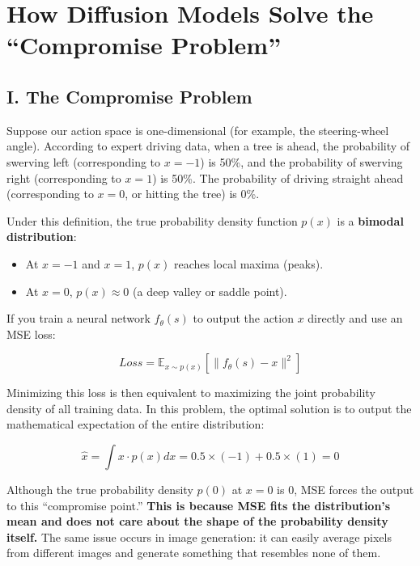 \setcounter{section}{4}

\hypertarget{how-diffusion-models-solve-the-compromise-problem}{%
\section{How Diffusion Models Solve the ``Compromise Problem''}\label{how-diffusion-models-solve-the-compromise-problem}}

\hypertarget{i.-the-compromise-problem}{%
\subsection{I. The Compromise Problem}\label{i.-the-compromise-problem}}

Suppose our action space is one-dimensional (for example, the steering-wheel angle). According to expert driving data, when a tree is ahead, the probability of swerving left (corresponding to \(x=-1\)) is 50\%, and the probability of swerving right (corresponding to \(x=1\)) is 50\%. The probability of driving straight ahead (corresponding to \(x=0\), or hitting the tree) is 0\%.

Under this definition, the true probability density function \(p(x)\) is a \textbf{bimodal distribution}:

\begin{itemize}
\tightlist
\item
  At \(x=-1\) and \(x=1\), \(p(x)\) reaches local maxima (peaks).
\item
  At \(x=0\), \(p(x)\approx 0\) (a deep valley or saddle point).
\end{itemize}

If you train a neural network \(f_\theta(s)\) to output the action \(x\) directly and use an MSE loss:

\[
Loss=\mathbb{E}_{x\sim p(x)}\left[\lVert f_\theta(s)-x\rVert^2\right]
\]

Minimizing this loss is then equivalent to maximizing the joint probability density of all training data. In this problem, the optimal solution is to output the mathematical expectation of the entire distribution:

\[
\hat{x}=\int x\cdot p(x)dx=0.5\times(-1)+0.5\times(1)=0
\]

Although the true probability density \(p(0)\) at \(x=0\) is 0, MSE forces the output to this ``compromise point.'' \textbf{This is because MSE fits the distribution's mean and does not care about the shape of the probability density itself.}
The same issue occurs in image generation: it can easily average pixels from different images and generate something that resembles none of them.

